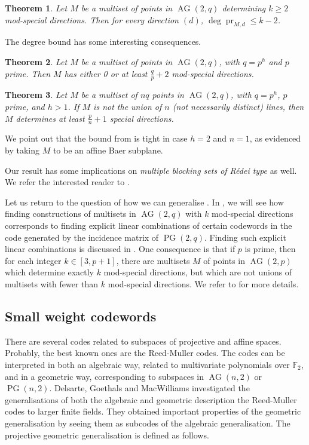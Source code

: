 \documentclass[12pt, a4paper]{article}
\newtheorem{thm}{Theorem}[section]
\theoremstyle{definition}
\newcommand{\FF}{\mathbb F}
\DeclareMathOperator{\pr}{pr}
\DeclareMathOperator{\PG}{PG}
\newcommand{\pg}{\PG}
\DeclareMathOperator{\AG}{AG}
\newcommand{\ag}{\AG}
\begin{document}
\begin{thm}
 \label{Thm:Pr}
Let $M$ be a multiset of points in $\ag(2,q)$ determining $k \geq 2$ mod-special directions.
 Then for every direction $(d)$, $\deg \pr_{M,d} \leq k-2$.
\end{thm}

The degree bound has some interesting consequences.

\begin{thm}
 \label{Thm:MinModSpecialDir}
 Let $M$ be a multiset of points in $\ag(2,q)$, with $q=p^h$ and $p$ prime.
 Then $M$ has either 0 or at least $\frac qp + 2$ mod-special directions.
\end{thm}

\begin{thm}
 \label{Thm:MinSpecialDir}
 Let $M$ be a multiset of $nq$ points in $\ag(2,q)$, with $q=p^h$, $p$ prime, and $h > 1$.
 If $M$ is not the union of $n$ (not necessarily distinct) lines, then $M$ determines at least $\frac pn + 1$ special directions.
\end{thm}

We point out that the bound from  is tight in case $h=2$ and $n=1$, as evidenced by taking $M$ to be an affine Baer subplane. 

Our result has some implications on \emph{multiple blocking sets of R\'edei type} as well.
We refer the interested reader to .

\bigskip

Let us return to the question of how we can generalise .
In , we will see how finding constructions of multisets in $\ag(2,q)$ with $k$ mod-special directions corresponds to finding explicit linear combinations of certain codewords in the code generated by the incidence matrix of $\pg(2,q)$.
Finding such explicit linear combinations is discussed in .
One consequence is that if $p$ is prime, then for each integer $k \in [3,p+1]$, there are multisets $M$ of points in $\ag(2,p)$ which determine exactly $k$ mod-special directions, but which are not unions of multisets with fewer than $k$ mod-special directions.
We refer to  for more details.

\subsection{Small weight codewords}

There are several codes related to subspaces of projective and affine spaces. 
Probably, the best known ones are the Reed-Muller codes.
The codes can be interpreted in both an algebraic way, related to multivariate polynomials over $\FF_2$, and in a geometric way, corresponding to subspaces in $\ag(n,2)$ or $\pg(n,2)$.
Delsarte, Goethals and MacWilliams \cite{delsartegoethalsmacwilliams} investigated the generalisations of both the algebraic and geometric description the Reed-Muller codes to larger finite fields.
They obtained important properties of the geometric generalisation by seeing them as subcodes of the algebraic generalisation.
The projective geometric generalisation is defined as follows.
\end{document}
